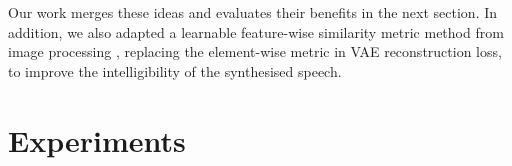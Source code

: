 \documentclass{article}
\begin{document}
Our work merges these ideas and evaluates their benefits in the next section. In addition, we also adapted a learnable feature-wise similarity metric method from image processing \citep{Larsen2015}, replacing the element-wise metric in VAE reconstruction loss, to improve the intelligibility of the synthesised speech.

\section{Experiments}
\label{sec:experiments}



\end{document}
